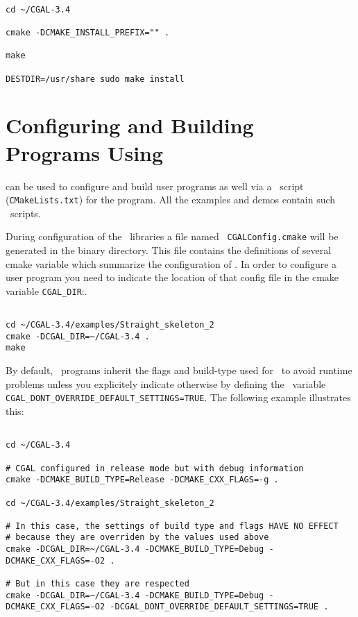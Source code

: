 {\ccTexHtml{\scriptsize}{}
\begin{verbatim}

cd ~/CGAL-3.4

cmake -DCMAKE_INSTALL_PREFIX="" . 

make

DESTDIR=/usr/share sudo make install

\end{verbatim}
}



\section{Configuring and Building Programs Using \cgal}

\cmake can be used to configure and build user programs as well via a \cmake\ 
script ({\tt CMakeLists.txt}) for the program.  All the examples and
demos contain such \cmake\ scripts.

During configuration of the \cgal\ libraries a file named {\tt
CGALConfig.cmake} will be generated in the binary directory. This file
contains the definitions of several cmake variable which summarize the
configuration of \cgal. In order to configure a user program you need
to indicate the location of that config file in the cmake variable
\texttt{CGAL\_DIR}:.

{\ccTexHtml{\scriptsize}{}
\begin{verbatim}

cd ~/CGAL-3.4/examples/Straight_skeleton_2
cmake -DCGAL_DIR=~/CGAL-3.4 .
make

\end{verbatim}
}

By default, \cgal\ programs inherit the flags and build-type used
for \cgal\ to avoid runtime problems unless you explicitely indicate otherwise by
defining the \cmake\ variable {\tt CGAL\_DONT\_OVERRIDE\_DEFAULT\_SETTINGS=TRUE}.
The following example illustrates this:

{\ccTexHtml{\scriptsize}{}
\begin{verbatim}

cd ~/CGAL-3.4

# CGAL configured in release mode but with debug information 
cmake -DCMAKE_BUILD_TYPE=Release -DCMAKE_CXX_FLAGS=-g .

cd ~/CGAL-3.4/examples/Straight_skeleton_2

# In this case, the settings of build type and flags HAVE NO EFFECT
# because they are overriden by the values used above
cmake -DCGAL_DIR=~/CGAL-3.4 -DCMAKE_BUILD_TYPE=Debug -DCMAKE_CXX_FLAGS=-O2 . 

# But in this case they are respected
cmake -DCGAL_DIR=~/CGAL-3.4 -DCMAKE_BUILD_TYPE=Debug -DCMAKE_CXX_FLAGS=-O2 -DCGAL_DONT_OVERRIDE_DEFAULT_SETTINGS=TRUE . 

\end{verbatim}
}

